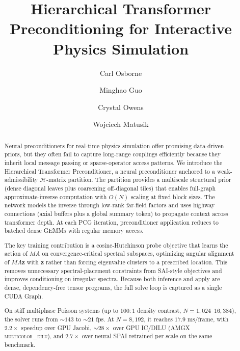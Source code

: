 \documentclass[acmtog]{acmart}
\theoremstyle{plain}
\begin{document}
\title{Hierarchical Transformer Preconditioning for Interactive Physics Simulation}

\author{Carl Osborne}

\author{Minghao Guo}

\author{Crystal Owens}

\author{Wojciech Matusik}

\renewcommand{\shortauthors}{Osborne et al.}

\begin{abstract}
Neural preconditioners for real-time physics simulation offer promising data-driven priors, but
they often fail to capture long-range couplings efficiently because they inherit local message
passing or sparse-operator access patterns. We introduce the Hierarchical Transformer
Preconditioner, a neural preconditioner anchored to a weak-admissibility $\mathcal{H}$-matrix
partition. The partition provides a multiscale structural prior (dense diagonal leaves plus
coarsening off-diagonal tiles) that enables full-graph approximate-inverse computation with
$O(N)$ scaling at fixed block sizes. The network models the inverse through low-rank far-field
factors and uses highway connections (axial buffers plus a global summary token) to propagate
context across transformer depth. At each PCG iteration, preconditioner application reduces to
batched dense GEMMs with regular memory access.

The key training contribution is a cosine-Hutchinson probe objective that learns the action of
$MA$ on convergence-critical spectral subspaces, optimizing angular alignment of $MA\mathbf{z}$
with $\mathbf{z}$ rather than forcing eigenvalue clusters to a prescribed location. This removes
unnecessary spectral-placement constraints from SAI-style objectives and improves conditioning on
irregular spectra. Because both inference and apply are dense, dependency-free tensor programs,
the full solve loop is captured as a single CUDA Graph.

On stiff multiphase Poisson systems (up to $100\!:\!1$ density contrast,
$N\!=\!1{,}024$--$16{,}384$), the solver runs from $\sim\!143$ to $\sim\!21$ fps. At
$N\!=\!8{,}192$, it reaches $17.9$ ms/frame, with $2.2\times$ speedup over GPU Jacobi,
$\sim\!28\times$ over GPU IC/DILU (AMGX \textsc{multicolor\_dilu}), and $2.7\times$ over
neural SPAI retrained per scale on the same benchmark.
\end{abstract}
\end{document}
